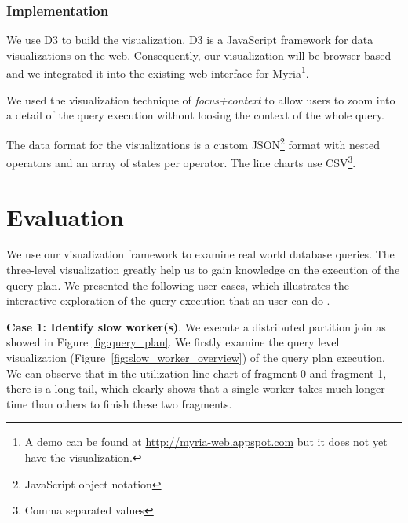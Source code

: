 \documentclass[11pt]{scrartcl}
\begin{document}

\subsubsection{Implementation}

We use D3\cite{bostock2011d3} to build the visualization. D3 is a JavaScript framework for data visualizations on the web. Consequently, our visualization will be browser based and we integrated it into the existing web interface for Myria\footnote{A demo can be found at \url{http://myria-web.appspot.com} but it does not yet have the visualization.}.

We used the visualization technique of \emph{focus+context}\cite{furnas1986generalized} to allow users to zoom into a detail of the query execution without loosing the context of the whole query.

The data format for the visualizations is a custom JSON\footnote{JavaScript object notation} format with nested operators and an array of states per operator. The line charts use CSV\footnote{Comma separated values}.


\section{Evaluation}
\label{sec:evaluation}
We use our visualization framework to examine real world database queries. The three-level visualization greatly help us to gain knowledge on the execution of the query plan. We presented the following user cases, which illustrates the interactive exploration of the query execution that an user can do .

\noindent \textbf{Case 1: Identify slow worker(s)}.
We execute a distributed partition join as showed in Figure \ref{fig:query_plan}. We firstly examine the query level visualization (Figure~\ref{fig:slow_worker_overview}) of the query plan execution. We can observe that in the utilization line chart of fragment 0 and fragment 1, there is a long tail, which clearly shows that a single worker takes much longer time than others to finish these two fragments.  
\end{document}

